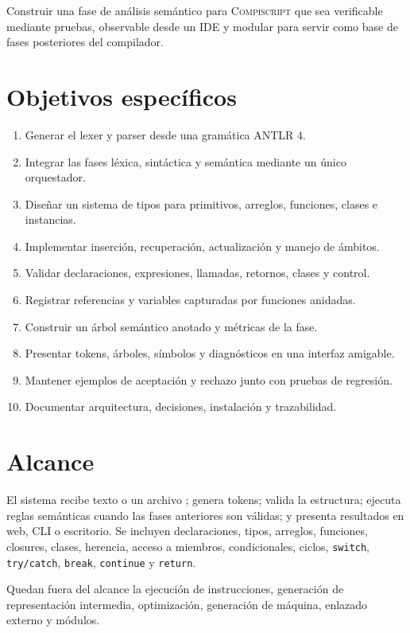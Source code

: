 \documentclass[11pt,letterpaper,oneside]{report}
\newcommand{\archivo}[1]{\path{#1}}
\newcommand{\codigo}[1]{\texttt{#1}}
\newcommand{\Compiscript}{\textsc{Compiscript}}
\newcommand{\ANTLR}{ANTLR 4}
\begin{document}
Construir una fase de análisis semántico para \Compiscript{} que sea verificable
mediante pruebas, observable desde un IDE y modular para servir como base de fases
posteriores del compilador.

\section{Objetivos específicos}

\begin{enumerate}
  \item Generar el lexer y parser desde una gramática \ANTLR.
  \item Integrar las fases léxica, sintáctica y semántica mediante un único orquestador.
  \item Diseñar un sistema de tipos para primitivos, arreglos, funciones, clases e instancias.
  \item Implementar inserción, recuperación, actualización y manejo de ámbitos.
  \item Validar declaraciones, expresiones, llamadas, retornos, clases y control.
  \item Registrar referencias y variables capturadas por funciones anidadas.
  \item Construir un árbol semántico anotado y métricas de la fase.
  \item Presentar tokens, árboles, símbolos y diagnósticos en una interfaz amigable.
  \item Mantener ejemplos de aceptación y rechazo junto con pruebas de regresión.
  \item Documentar arquitectura, decisiones, instalación y trazabilidad.
\end{enumerate}

\section{Alcance}

El sistema recibe texto o un archivo \archivo{.cps}; genera tokens; valida la
estructura; ejecuta reglas semánticas cuando las fases anteriores son válidas; y
presenta resultados en web, CLI o escritorio. Se incluyen declaraciones, tipos,
arreglos, funciones, closures, clases, herencia, acceso a miembros, condicionales,
ciclos, \codigo{switch}, \codigo{try/catch}, \codigo{break}, \codigo{continue} y
\codigo{return}.

Quedan fuera del alcance la ejecución de instrucciones, generación de representación
intermedia, optimización, generación de máquina, enlazado externo y módulos.
\end{document}
